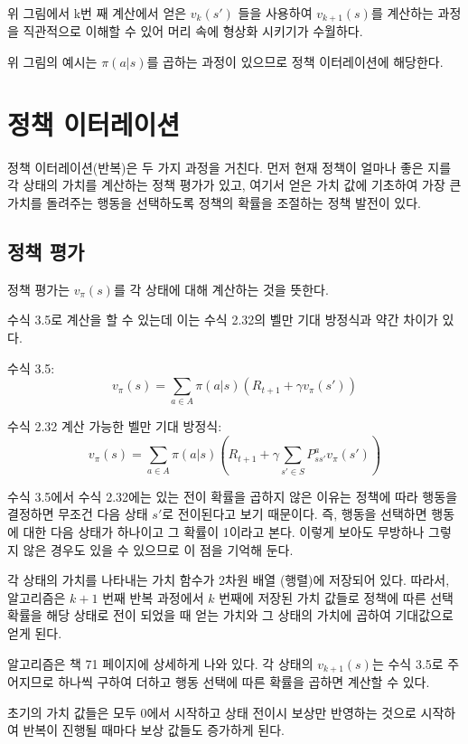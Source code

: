 \documentclass[ %
    a4paper,    %
    amsmath,    %
    itemph,     %
]{oblivoir}     %
\begin{document}
위 그림에서 k번 째 계산에서 얻은 $v_k(s')$ 들을 사용하여 $v_{k+1}(s)$를 계산하는 
과정을 직관적으로 이해할 수 있어 머리 속에 형상화 시키기가 수월하다. 

위 그림의 예시는 $\pi(a|s)$를 곱하는 과정이 있으므로 정책 이터레이션에 해당한다. 

\section{정책 이터레이션}

정책 이터레이션(반복)은 두 가지 과정을 거친다. 먼저 현재 정책이 얼마나 
좋은 지를 각 상태의 가치를 계산하는 정책 평가가 있고, 여기서 얻은 가치 값에 기초하여 
가장 큰 가치를 돌려주는 행동을 선택하도록 정책의 확률을 조절하는 정책 발전이 있다. 


\subsection{정책 평가} 

정책 평가는 $v_\pi(s)$를 각 상태에 대해 계산하는 것을 뜻한다. 

수식 3.5로 계산을 할 수 있는데 이는 수식 2.32의 벨만 기대 방정식과 약간 차이가 있다. 

수식 3.5: 
$$
v_\pi(s) = \sum_{a \in A} \pi(a|s)(R_{t+1} + \gamma v_\pi(s'))
$$

수식 2.32 계산 가능한 벨만 기대 방정식: 
$$
v_\pi(s) = \sum_{a\in A} \pi(a|s) (R_{t+1} + \gamma \sum_{s' \in S} P_{ss'}^a v_\pi(s'))
$$

수식 3.5에서 수식 2.32에는 있는 전이 확률을 곱하지 않은 이유는 정책에 따라 행동을 결정하면 
무조건 다음 상태 $s'$로 전이된다고 보기 때문이다. 즉, 행동을 선택하면 행동에 대한 다음 상태가 
하나이고 그 확률이 1이라고 본다. 이렇게 보아도 무방하나 그렇지 않은 경우도 있을 수 있으므로 
이 점을 기억해 둔다. 

각 상태의 가치를 나타내는 가치 함수가 2차원 배열 (행렬)에 저장되어 있다. 따라서, 알고리즘은 
$k+1$ 번째 반복 과정에서 $k$ 번째에 저장된 가치 값들로 정책에 따른 선택 확률을 해당 상태로 
전이 되었을 때 얻는 가치와 그 상태의 가치에 곱하여 기대값으로 얻게 된다. 

알고리즘은 책 71 페이지에 상세하게 나와 있다. 각 상태의 $v_{k+1}(s)$는 수식 3.5로 주어지므로 
하나씩 구하여 더하고 행동 선택에 따른 확률을 곱하면 계산할 수 있다. 

초기의 가치 값들은 모두 0에서 시작하고 상태 전이시 보상만 반영하는 것으로 시작하여 
반복이 진행될 때마다 보상 값들도 증가하게 된다. 
\end{document}
